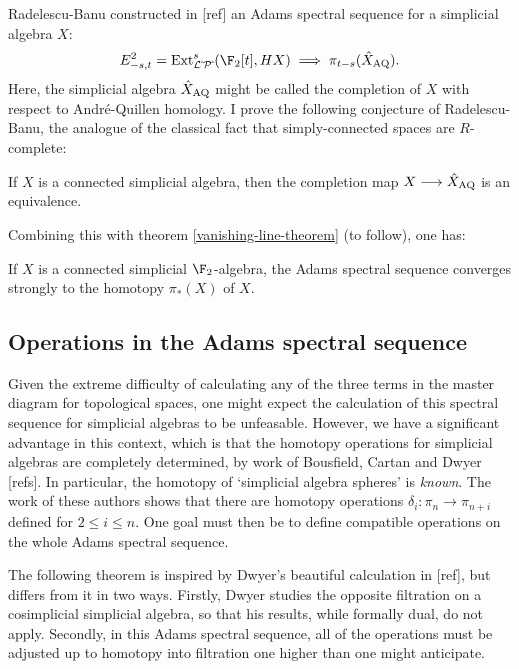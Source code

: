 \documentclass[11pt]{article}
\begin{document}
Radelescu-Banu constructed in [ref] an Adams spectral sequence for a simplicial algebra $X$:
\[E^2_{-s,t}=\Ext^s_{\calL\hat{\,}\calP\hat{\,}}(\F_2[t],HX)\implies \pi_{t-s}(\hat X_\textup{AQ}).\]
Here, the simplicial algebra $\hat X_\textup{AQ}$ might be called the completion of $X$ with respect to Andr\'e-Quillen homology. I prove the following conjecture of Radelescu-Banu, the analogue of the classical fact that simply-connected spaces are $R$-complete:
\begin{thm*}
If $X$ is a connected simplicial algebra, then the completion map $X\to \hat X_\textup{AQ}$ is an equivalence.
\end{thm*}
Combining this with theorem \ref{vanishing-line-theorem} (to follow), one has:
\begin{cor*}
If $X$ is a connected simplicial $\F_2$-algebra, the Adams spectral sequence converges strongly to the homotopy $\pi_*(X)$ of $X$.
\end{cor*}
\subsection*{Operations in the Adams spectral sequence}
Given the extreme difficulty of calculating any of the three terms in the master diagram for topological spaces, one might expect the calculation of this spectral sequence for simplicial algebras to be unfeasable. However, we have a significant advantage in this context, which is that the homotopy operations for simplicial algebras are completely determined, by work of Bousfield, Cartan and Dwyer [refs]. In particular, the homotopy of `simplicial algebra spheres' is \emph{known}. The work of these authors shows that there are homotopy operations $\delta_i:\pi_{n}\to\pi_{n+i}$ defined for $2\leq i\leq n$.
One goal must then be to define compatible operations on the whole Adams spectral sequence.

The following theorem is inspired by Dwyer's beautiful calculation in [ref], but differs from it in two ways. Firstly, Dwyer studies the opposite filtration on a cosimplicial simplicial algebra, so that his results, while formally dual, do not apply. Secondly, in this Adams spectral sequence, all of the operations must be adjusted up to homotopy into filtration one higher than one might anticipate.
\end{document}
